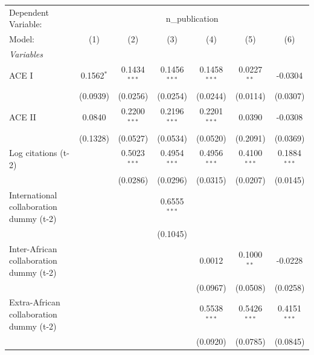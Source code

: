 
\begingroup
\centering
\begin{tabular}{lcccccc}
   \tabularnewline \midrule \midrule
   Dependent Variable: & \multicolumn{6}{c}{n\_publication}\\
   Model:                                  & (1)          & (2)            & (3)            & (4)            & (5)            & (6)\\  
   \midrule
   \emph{Variables}\\
   ACE I                                   & 0.1562$^{*}$ & 0.1434$^{***}$ & 0.1456$^{***}$ & 0.1458$^{***}$ & 0.0227$^{**}$  & -0.0304\\   
                                           & (0.0939)     & (0.0256)       & (0.0254)       & (0.0244)       & (0.0114)       & (0.0307)\\   
   ACE II                                  & 0.0840       & 0.2200$^{***}$ & 0.2196$^{***}$ & 0.2201$^{***}$ & 0.0390         & -0.0308\\   
                                           & (0.1328)     & (0.0527)       & (0.0534)       & (0.0520)       & (0.2091)       & (0.0369)\\   
   Log citations (t-2)                     &              & 0.5023$^{***}$ & 0.4954$^{***}$ & 0.4956$^{***}$ & 0.4100$^{***}$ & 0.1884$^{***}$\\   
                                           &              & (0.0286)       & (0.0296)       & (0.0315)       & (0.0207)       & (0.0145)\\   
   International collaboration dummy (t-2) &              &                & 0.6555$^{***}$ &                &                &   \\   
                                           &              &                & (0.1045)       &                &                &   \\   
   Inter-African collaboration dummy (t-2) &              &                &                & 0.0012         & 0.1000$^{**}$  & -0.0228\\   
                                           &              &                &                & (0.0967)       & (0.0508)       & (0.0258)\\   
   Extra-African collaboration dummy (t-2) &              &                &                & 0.5538$^{***}$ & 0.5426$^{***}$ & 0.4151$^{***}$\\   
                                           &              &                &                & (0.0920)       & (0.0785)       & (0.0845)\\   

\end{tabular}
